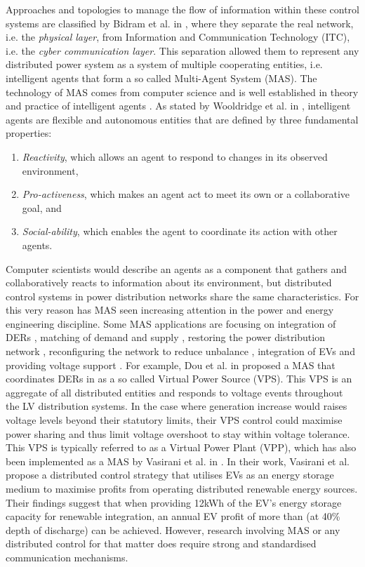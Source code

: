 Approaches and topologies to manage the flow of information within these control systems are classified by Bidram et al. in \cite{Bidram2014}, where they separate the real network, i.e. the \textit{physical layer}, from Information and Communication Technology (ITC), i.e. the \textit{cyber communication layer}.
This separation allowed them to represent any distributed power system as a system of multiple cooperating entities, i.e. intelligent agents that form a so called Multi-Agent System (MAS).
The technology of MAS comes from computer science and is well established in theory and practice of intelligent agents \cite{Russell2009}.
As stated by Wooldridge et al. in \cite{Wooldridge1995}, intelligent agents are flexible and autonomous entities that are defined by three fundamental properties:

\begin{enumerate}
	\item \textit{Reactivity}, which allows an agent to respond to changes in its observed environment,
	\item \textit{Pro-activeness}, which makes an agent act to meet its own or a collaborative goal, and
	\item \textit{Social-ability}, which enables the agent to coordinate its action with other agents.
\end{enumerate}

Computer scientists would describe an agents as a component that gathers and collaboratively reacts to information about its environment, but distributed control systems in power distribution networks share the same characteristics.
For this very reason has MAS seen increasing attention in the power and energy engineering discipline.
Some MAS applications are focusing on integration of DERs \cite{Al-Hinai2004, Dimeas2005, Dou2017, Vasirani2013, Gomez-Sanz2014}, matching of demand and supply \cite{Kok2005}, restoring the power distribution network \cite{Li2012}, reconfiguring the network to reduce unbalance \cite{Ding2016}, integration of EVs \cite{Lopez2011, Karfopoulos2013, Ramachandran2013, GrauUnda2014} and providing voltage support \cite{Baran2007}.
For example, Dou et al. in \cite{Dou2017} proposed a MAS that coordinates DERs in as a so called Virtual Power Source (VPS).
This VPS is an aggregate of all distributed entities and responds to voltage events throughout the LV distribution systems.
In the case where generation increase would raises voltage levels beyond their statutory limits, their VPS control could maximise power sharing and thus limit voltage overshoot to stay within voltage tolerance.
This VPS is typically referred to as a Virtual Power Plant (VPP), which has also been implemented as a MAS by Vasirani et al. in \cite{Vasirani2013}.
In their work, Vasirani et al. propose a distributed control strategy that utilises EVs as an energy storage medium to maximise profits from operating distributed renewable energy sources.
Their findings suggest that when providing 12kWh of the EV's energy storage capacity for renewable integration, an annual EV profit of more than  (at 40\% depth of discharge) can be achieved.
However, research involving MAS or any distributed control for that matter does require strong and standardised communication mechanisms.

